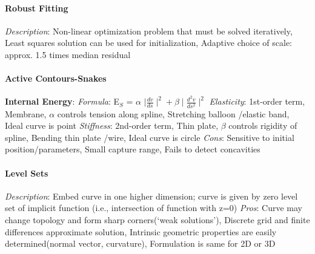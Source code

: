 \documentclass{article}
\begin{document}
\begin{multicols*}{2}
        \paragraph*{Robust Fitting}
        \textit{Description}: Non-linear optimization problem that must be solved iteratively, Least squares solution
        can be used for initialization, Adaptive choice of scale: approx. 1.5 times median residual
        \paragraph*{Active Contours-Snakes}
        \textbf{Internal Energy}:\newline
        \textit{Formula}: E$_{S}$ = $\alpha$ $\mid\frac{dv}{ds}\mid^2 + \beta\mid\frac{d^2v}{ds^2}\mid^2$\newline
        \textit{Elasticity}: 1st-order term, Membrane, $\alpha$ controls tension along spline, Stretching balloon
        /elastic band, Ideal curve is point\newline
        \textit{Stiffness}: 2nd-order term, Thin plate, $\beta$ controls rigidity of spline, Bending thin plate
        /wire, Ideal curve is circle\newline
        \textit{Cons}: Sensitive to initial position/parameters, Small capture range, Fails to detect
        concavities
        \paragraph*{Level Sets}
        \textit{Description}: Embed curve in one higher dimension; curve is given by zero level set of implicit
        function (i.e., intersection of function with z=0)\newline
        \textit{Pros}: Curve may change topology and form sharp corners(\textquoteleft weak solutions\textquoteright),
        Discrete grid and finite differences approximate solution, Intrinsic geometric properties are easily
        determined(normal vector, curvature), Formulation is same for 2D or 3D

\end{multicols*}
\end{document}
